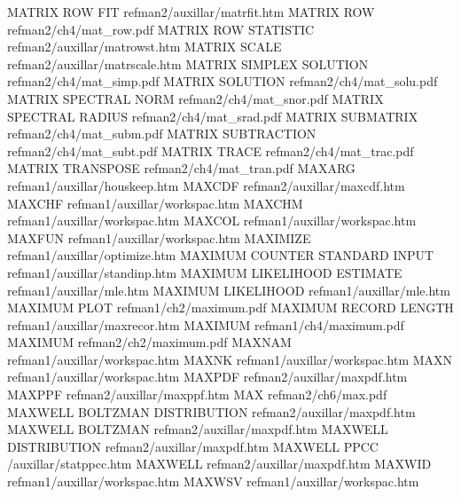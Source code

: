 MATRIX ROW FIT                          refman2/auxillar/matrfit.htm
MATRIX ROW                              refman2/ch4/mat_row.pdf
MATRIX ROW STATISTIC                    refman2/auxillar/matrowst.htm
MATRIX SCALE                            refman2/auxillar/matrscale.htm
MATRIX SIMPLEX SOLUTION                 refman2/ch4/mat_simp.pdf
MATRIX SOLUTION                         refman2/ch4/mat_solu.pdf
MATRIX SPECTRAL NORM                    refman2/ch4/mat_snor.pdf
MATRIX SPECTRAL RADIUS                  refman2/ch4/mat_srad.pdf
MATRIX SUBMATRIX                        refman2/ch4/mat_subm.pdf
MATRIX SUBTRACTION                      refman2/ch4/mat_subt.pdf
MATRIX TRACE                            refman2/ch4/mat_trac.pdf
MATRIX TRANSPOSE                        refman2/ch4/mat_tran.pdf
MAXARG                                  refman1/auxillar/houskeep.htm
MAXCDF                                  refman2/auxillar/maxcdf.htm
MAXCHF                                  refman1/auxillar/workspac.htm
MAXCHM                                  refman1/auxillar/workspac.htm
MAXCOL                                  refman1/auxillar/workspac.htm
MAXFUN                                  refman1/auxillar/workspac.htm
MAXIMIZE                                refman1/auxillar/optimize.htm
MAXIMUM COUNTER STANDARD INPUT          refman1/auxillar/standinp.htm
MAXIMUM LIKELIHOOD ESTIMATE             refman1/auxillar/mle.htm
MAXIMUM LIKELIHOOD                      refman1/auxillar/mle.htm
MAXIMUM PLOT                            refman1/ch2/maximum.pdf
MAXIMUM RECORD LENGTH                   refman1/auxillar/maxrecor.htm
MAXIMUM                                 refman1/ch4/maximum.pdf
MAXIMUM                                 refman2/ch2/maximum.pdf
MAXNAM                                  refman1/auxillar/workspac.htm
MAXNK                                   refman1/auxillar/workspac.htm
MAXN                                    refman1/auxillar/workspac.htm
MAXPDF                                  refman2/auxillar/maxpdf.htm
MAXPPF                                  refman2/auxillar/maxppf.htm
MAX                                     refman2/ch6/max.pdf
MAXWELL BOLTZMAN DISTRIBUTION           refman2/auxillar/maxpdf.htm
MAXWELL BOLTZMAN                        refman2/auxillar/maxpdf.htm
MAXWELL DISTRIBUTION                    refman2/auxillar/maxpdf.htm
MAXWELL PPCC                            /auxillar/statppcc.htm
MAXWELL                                 refman2/auxillar/maxpdf.htm
MAXWID                                  refman1/auxillar/workspac.htm
MAXWSV                                  refman1/auxillar/workspac.htm
